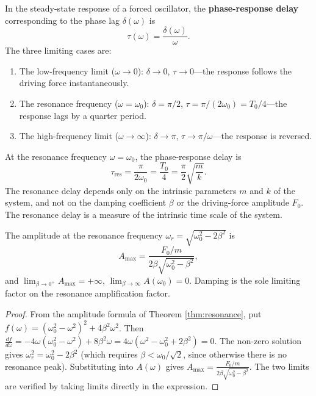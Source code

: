 \begin{definition}\label{def:forced_phase_delay}
In the steady-state response of a forced oscillator, the \textbf{phase-response delay} corresponding to the phase lag $\delta(\omega)$ is
\[
\tau(\omega) = \frac{\delta(\omega)}{\omega}.
\]
The three limiting cases are:
\begin{enumerate}[label=(\roman*)]
    \item The low-frequency limit ($\omega \to 0$): $\delta \to 0$, $\tau \to 0$---the response follows the driving force instantaneously.
    \item The resonance frequency ($\omega = \omega_0$): $\delta = \pi/2$, $\tau = \pi/(2\omega_0) = T_0/4$---the response lags by a quarter period.
    \item The high-frequency limit ($\omega \to \infty$): $\delta \to \pi$, $\tau \to \pi/\omega$---the response is reversed.
\end{enumerate}
\end{definition}

\begin{proposition}\label{prop:resonance_delay_parameters}
At the resonance frequency $\omega = \omega_0$, the phase-response delay is
\[
\tau_{\text{res}} = \frac{\pi}{2\omega_0} = \frac{T_0}{4} = \frac{\pi}{2}\sqrt{\frac{m}{k}}.
\]
The resonance delay depends only on the intrinsic parameters $m$ and $k$ of the system, and not on the damping coefficient $\beta$ or the driving-force amplitude $F_0$. The resonance delay is a measure of the intrinsic time scale of the system.
\end{proposition}

\begin{lemma}\label{ch23_resonance_amplitude}
The amplitude at the resonance frequency $\omega_r = \sqrt{\omega_0^2 - 2\beta^2}$ is
\[
A_{\max} = \frac{F_0/m}{2\beta\sqrt{\omega_0^2 - \beta^2}},
\]
and $\lim_{\beta \to 0^+} A_{\max} = +\infty$, $\lim_{\beta \to \infty} A(\omega_0) = 0$. Damping is the sole limiting factor on the resonance amplification factor.
\end{lemma}

\begin{proof}
From the amplitude formula of Theorem \ref{thm:resonance}, put $f(\omega) = (\omega_0^2 - \omega^2)^2 + 4\beta^2\omega^2$. Then $\frac{df}{d\omega} = -4\omega(\omega_0^2-\omega^2) + 8\beta^2\omega = 4\omega(\omega^2 - \omega_0^2 + 2\beta^2) = 0$. The non-zero solution gives $\omega_r^2 = \omega_0^2 - 2\beta^2$ (which requires $\beta < \omega_0/\sqrt{2}$, since otherwise there is no resonance peak). Substituting into $A(\omega)$ gives $A_{\max} = \frac{F_0/m}{2\beta\sqrt{\omega_0^2-\beta^2}}$. The two limits are verified by taking limits directly in the expression.
\end{proof}

